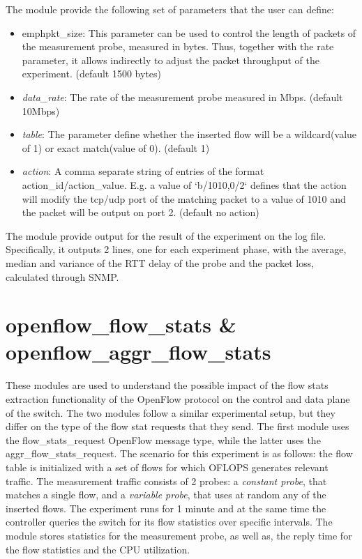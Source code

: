 \documentclass{book}
\begin{document}
The module provide the following set of parameters that the user can define:
\begin{itemize}
    \item emph{pkt\_size}: This parameter can be used to control the length of
        packets of the measurement probe, measured in bytes. Thus, together with the 
        rate parameter, it allows indirectly to adjust the packet throughput of the 
        experiment. (default 1500 bytes)
    \item \emph{data\_rate}: The rate of the measurement probe measured in Mbps.
        (default 10Mbps) 
    \item \emph{table}: The parameter define whether the inserted flow will be 
        a wildcard(value of 1) or exact match(value of 0).  (default 1)
    \item \emph{action}:  A comma separate string of entries of the format
        action\_id/action\_value. E.g. a value of `b/1010,0/2` defines that the action
        will modify the tcp/udp port of the matching packet to a value of 1010 and the
        packet will be output on port 2. (default no action)
\end{itemize}

The module provide output for the result of the experiment on the log file. 
Specifically, it outputs 2 lines, one for each experiment phase, with the average, median 
and variance of the RTT delay of the probe and the packet
loss, calculated through SNMP. 

\section{openflow\_flow\_stats \& openflow\_aggr\_flow\_stats}

These modules are used to understand the possible impact of the flow stats
extraction functionality of the OpenFlow protocol on the control and data plane of the
switch. The two modules follow a similar experimental setup, but they differ on
the type of the flow stat requests that they send. The first module uses the
flow\_stats\_request OpenFlow message type, while the latter uses the
aggr\_flow\_stats\_request. 
The scenario for this experiment is as follows: the flow table is
initialized with a set of flows for which OFLOPS generates relevant traffic. 
The measurement traffic consists of 2 probes: a \emph{constant probe}, that
matches a single flow, and a \emph{variable probe}, that uses at
random any of the inserted flows. The experiment runs for 1 minute and at 
the same time the controller queries the switch for its flow statistics over 
specific intervals. The module stores statistics for the measurement probe, as
well as, the reply time for the flow statistics and the CPU utilization. 
\end{document}
